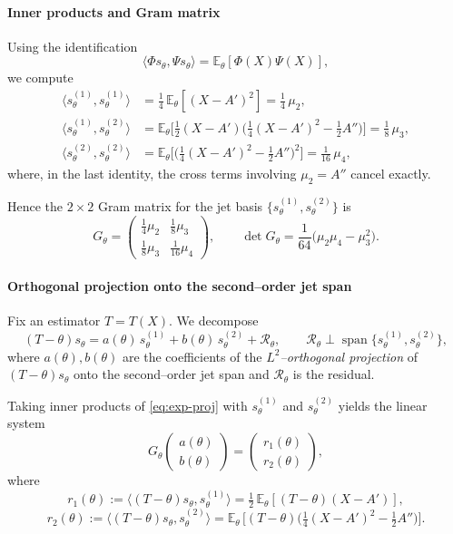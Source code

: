 \documentclass[3p,times]{elsarticle}
\begin{document}
\paragraph{Inner products and Gram matrix}
Using the identification
\[
\langle \Phi s_\theta,\Psi s_\theta\rangle
=\mathbb{E}_\theta[\Phi(X)\Psi(X)],
\]
we compute
\begin{align*}
\langle s_\theta^{(1)},s_\theta^{(1)}\rangle
&=\tfrac14\,\mathbb{E}_\theta[(X-A')^2]
=\tfrac14\,\mu_2,\\[4pt]
\langle s_\theta^{(1)},s_\theta^{(2)}\rangle
&=\mathbb{E}_\theta\!\Big[\tfrac12(X-A')\Big(\tfrac14(X-A')^2-\tfrac12A''\Big)\Big]
=\tfrac18\,\mu_3,\\[4pt]
\langle s_\theta^{(2)},s_\theta^{(2)}\rangle
&=\mathbb{E}_\theta\!\Big[\Big(\tfrac14(X-A')^2-\tfrac12A''\Big)^2\Big]
=\tfrac1{16}\,\mu_4,
\end{align*}
where, in the last identity, the cross terms involving $\mu_2=A''$ cancel exactly.

Hence the $2\times2$ Gram matrix for the jet basis
$\{s_\theta^{(1)},s_\theta^{(2)}\}$ is
\[
G_\theta
=
\begin{pmatrix}
\frac14\mu_2 & \frac18\mu_3\\[4pt]
\frac18\mu_3 & \frac1{16}\mu_4
\end{pmatrix},
\qquad
\det G_\theta=\frac1{64}\big(\mu_2\mu_4-\mu_3^2\big).
\]

\paragraph{Orthogonal projection onto the second--order jet span}
Fix an estimator $T=T(X)$.  
We decompose
\begin{equation}
(T-\theta)s_\theta
=
a(\theta)\,s_\theta^{(1)}
+
b(\theta)\,s_\theta^{(2)}
+
\mathcal{R}_\theta,
\qquad
\mathcal{R}_\theta\perp\operatorname{span}\{s_\theta^{(1)},s_\theta^{(2)}\},
\label{eq:exp-proj}
\end{equation}
where $a(\theta),b(\theta)$ are the coefficients of the
\emph{$L^2$--orthogonal projection} of $(T-\theta)s_\theta$ onto the
second--order jet span and $\mathcal{R}_\theta$ is the residual.

Taking inner products of \eqref{eq:exp-proj} with
$s_\theta^{(1)}$ and $s_\theta^{(2)}$ yields the linear system
\[
G_\theta
\begin{pmatrix} a(\theta) \\[2pt] b(\theta)\end{pmatrix}
=
\begin{pmatrix}
r_1(\theta)\\[2pt]
r_2(\theta)
\end{pmatrix},
\]
where
\[
r_1(\theta)
:=\langle (T-\theta)s_\theta, s_\theta^{(1)}\rangle
=\tfrac12\,\mathbb{E}_\theta[(T-\theta)(X-A')],
\]
\[
r_2(\theta)
:=\langle (T-\theta)s_\theta, s_\theta^{(2)}\rangle
=\mathbb{E}_\theta\,\!\Big[(T-\theta)\Big(\tfrac14(X-A')^2-\tfrac12A''\Big)\Big].
\]
\end{document}
